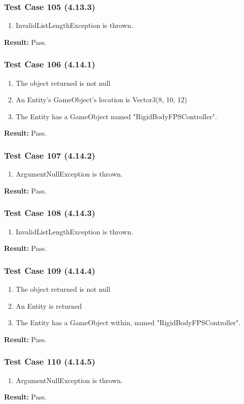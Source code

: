\documentclass[a4paper,12pt]{article}
\begin{document}
		\subsubsection{Test Case 105 (4.13.3)}
				\begin{enumerate}
					\item InvalidListLengthException  is thrown.
				\end{enumerate}
			\textbf{Result: }Pass.
		\subsubsection{Test Case 106 (4.14.1)}
				\begin{enumerate}
					\item The object returned is not null
					\item An Entity’s GameObject’s location is Vector3(8, 10, 12)
					\item The Entity has a GameObject named "RigidBodyFPSController".
				\end{enumerate}
			\textbf{Result: }Pass.
		\subsubsection{Test Case 107 (4.14.2)}
				\begin{enumerate}
					\item ArgumentNullException is thrown.
				\end{enumerate}
			\textbf{Result: }Pass.
		\subsubsection{Test Case 108 (4.14.3)}
				\begin{enumerate}
					\item InvalidListLengthException  is thrown.
				\end{enumerate}
			\textbf{Result: }Pass.
		\subsubsection{Test Case 109 (4.14.4)}
				\begin{enumerate}
					\item The object returned is not null
					\item An Entity is returned
					\item The Entity has a GameObject within, named "RigidBodyFPSController".
				\end{enumerate}
			\textbf{Result: }Pass.
		\subsubsection{Test Case 110 (4.14.5)}
				\begin{enumerate}
					\item ArgumentNullException is thrown.
				\end{enumerate}
			\textbf{Result: }Pass.
\end{document}
